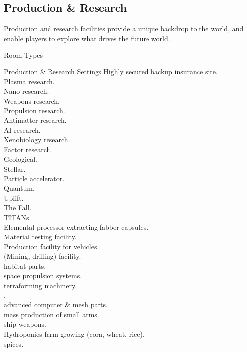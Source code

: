 \begin{multicols}{2}

\subsection*{Production \& Research}

Production and research facilities provide a unique backdrop to the world, and
enable players to explore what drives the future world.

Room Types
\end{multicols}

\begin{tableone}{Production \& Research Settings}
Highly secured backup insurance site.\\
Plasma research.\\
Nano research.\\
Weapons research.\\
Propulsion research.\\
Antimatter research.\\
AI research.\\
Xenobiology research.\\
Factor research.\\
Geological.\\
Stellar.\\
Particle accelerator.\\
Quantum.\\
Uplift.\\
The Fall.\\
TITANs.\\
Elemental processor extracting fabber capsules.\\
Material testing facility.\\
Production facility for vehicles.\\
(Mining, drilling) facility.\\
\textellipsis habitat parts.\\
\textellipsis space propulsion systems.\\
\textellipsis terraforming machinery.\\
\textellipsis {}.\\
\textellipsis advanced computer \& mesh parts.\\
\textellipsis mass production of small arms.\\
\textellipsis ship weapons.\\
Hydroponics farm growing (corn, wheat, rice).\\
\textellipsis spices.\\

\end{tableone}
